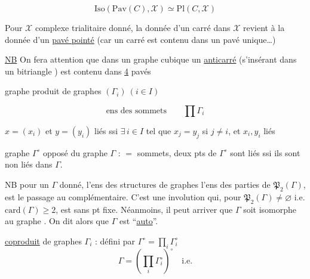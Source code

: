 \[
\mathrm{Iso}(\mathrm{Pav}(C),\mathcal X)\simeq\mathrm{Pl}(C,\mathcal X)
\]

Pour $\mathcal X$ complexe trialitaire donné,  la donnée d'un carré dans $\mathcal X$ revient à la donnée d'un \uline{pavé pointé} (car un carré est contenu dans un pavé unique\ldots)

\uline{NB} On fera attention que dans un graphe cubique un \uline{anticarré} (s'insérant  dans un bitriangle
) est contenu dans \uline{4} pavés


graphe produit de graphes $(\Gamma_i)\ (i\in I)$

\[
\text{ens des sommets}\qquad\prod\Gamma_i
\]

$x=(x_i)$ et $y=(y_i)$  liés ssi $\exists\,i\in I$ tel que $x_j=y_j$ si $j\ne i$, et $x_i,y_i$ liés

graphe  $\Gamma^\circ$  opposé du graphe $\Gamma$ : $=$ sommets, deux pts  de $\Gamma^\circ$ sont liés ssi ils sont non liés dans $\Gamma$.

NB pour un $\Gamma$ donné, l'ens des structures de  graphes   \inserted{$=$} l'ens des parties de \inserted{$^{\wedge}$} $\mathfrak P_2(\Gamma)$,    est le passage au complémentaire. C'est une involution qui, pour $\mathfrak P_2(\Gamma)\ne\varnothing$ i.e. $\mathrm{card}(\Gamma)\ge 2$, est sans pt fixe. Néanmoins, il peut arriver que $\Gamma$ soit isomorphe au graphe . On dit alors que $\Gamma$ est ``\uline{auto}''.

\uline{coproduit} de graphes $\Gamma_i$ :  défini par $\Gamma^\circ=\prod_i\Gamma_i^\circ$ 
\deleted{$\unsure{\Gamma=}$}
\[
\Gamma=\left(\prod_i\Gamma_i^\circ\right)^\circ\quad\text{i.e.}
\]

